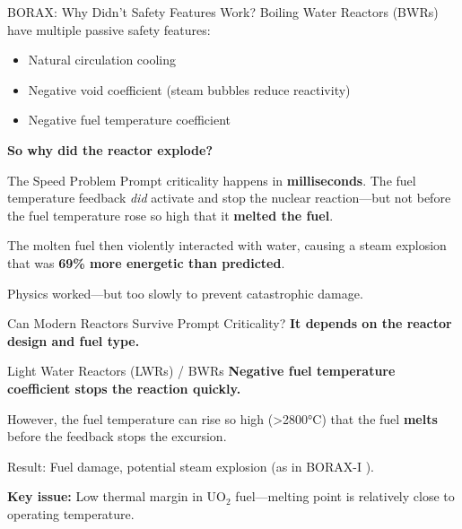 \documentclass[aspectratio=169]{beamer}
\begin{document}
\begin{frame}[allowframebreaks]{BORAX: Why Didn't Safety Features Work?}
    Boiling Water Reactors (BWRs) have multiple passive safety features:
    \begin{itemize}
        \item Natural circulation cooling
        \item Negative void coefficient (steam bubbles reduce reactivity)
        \item Negative fuel temperature coefficient
    \end{itemize}

    \vspace{1em}
    \textbf{So why did the reactor explode?}

    \vspace{1em}
    \begin{alertblock}{The Speed Problem}
        Prompt criticality happens in \textbf{milliseconds}. The fuel temperature feedback \textit{did} activate and stop the nuclear reaction—but not before the fuel temperature rose so high that it \textbf{melted the fuel}.
        
        The molten fuel then violently interacted with water, causing a steam explosion that was \textbf{69\% more energetic than predicted}.
        
        Physics worked—but too slowly to prevent catastrophic damage.
    \end{alertblock}
\end{frame}

\begin{frame}[allowframebreaks]{Can Modern Reactors Survive Prompt Criticality?}
    \textbf{It depends on the reactor design and fuel type.}

    \vspace{1em}
    \begin{block}{Light Water Reactors (LWRs) / BWRs}
        \textbf{Negative fuel temperature coefficient stops the reaction quickly.}
        
        However, the fuel temperature can rise so high (\textgreater 2800°C) that the fuel \textbf{melts} before the feedback stops the excursion.
        
        Result: Fuel damage, potential steam explosion (as in BORAX-I \cite{putman2012criticality}).
    \end{block}

    \vspace{1em}
    \textbf{Key issue:} Low thermal margin in UO$_2$ fuel—melting point is relatively close to operating temperature.
\end{frame}
\end{document}

